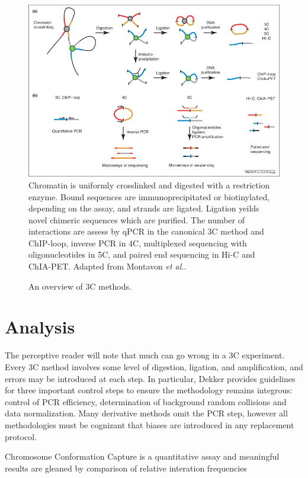 \documentclass[phd,tocprelim]{cornell}
\begin{document}
\begin{figure}[b]
  \centering
  \caption{An overview of 3C methods.}
  \includegraphics[width=\textwidth]{figures/CompareChromosomeCapture}
  \medskip
  \small
  Chromatin is uniformly crosslinked and digested with a restriction enzyme.
  Bound sequences are immunoprecipitated or biotinylated, depending on the
  assay, and strands are ligated.  Ligation yeilds novel chimeric sequences
  which are purified.  The number of interactions are assess by qPCR in
  the canonical 3C method and ChIP-loop, inverse PCR in 4C, multiplexed
  sequencing with oligonucleotides in 5C, and paired end sequencing in Hi-C
  and ChIA-PET\@.  Adapted from Montavon \textit{et al.}\cite{montavon2012}.
\end{figure}


\section{Analysis}

The perceptive reader will note that much can go wrong in a 3C experiment.
Every 3C method involves some level of digestion, ligation, and amplification,
and errors may be introduced at each step.  In particular, Dekker provides
guidelines for three important control steps to ensure the methodology remains
integrous: control of PCR efficiency, determination of background random
collisions and data normalization\cite{dekker2006}.  Many derivative methods
omit the PCR step, however all methodologies must be cognizant that biases are
introduced in any replacement protocol.


Chromosome Conformation Capture is a quantitative assay and meaningful
results are gleaned by comparison of relative interation frequencies
\end{document}
